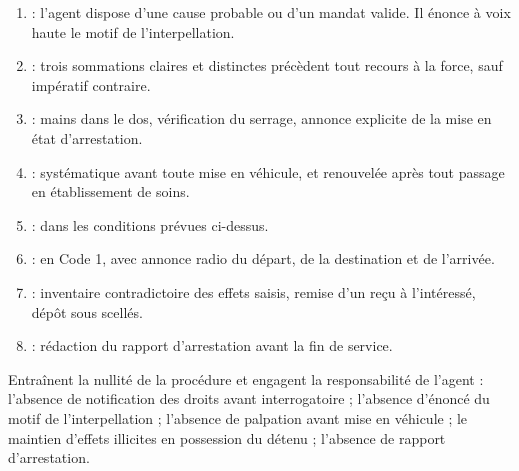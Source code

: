 \begin{enumerate}
  \item {} : l'agent dispose d'une cause probable ou d'un mandat valide. Il énonce à voix haute le motif de l'interpellation.
  \item {} : trois sommations claires et distinctes précèdent tout recours à la force, sauf impératif contraire.
  \item {} : mains dans le dos, vérification du serrage, annonce explicite de la mise en état d'arrestation.
  \item {} : systématique avant toute mise en véhicule, et renouvelée après tout passage en établissement de soins.
  \item {} : dans les conditions prévues ci-dessus.
  \item {} : en Code 1, avec annonce radio du départ, de la destination et de l'arrivée.
  \item {} : inventaire contradictoire des effets saisis, remise d'un reçu à l'intéressé, dépôt sous scellés.
  \item {} : rédaction du rapport d'arrestation avant la fin de service.
\end{enumerate}




\begin{interdit}
Entraînent la nullité de la procédure et engagent la responsabilité de l'agent : l'absence de notification des droits avant interrogatoire ; l'absence d'énoncé du motif de l'interpellation ; l'absence de palpation avant mise en véhicule ; le maintien d'effets illicites en possession du détenu ; l'absence de rapport d'arrestation.
\end{interdit}

